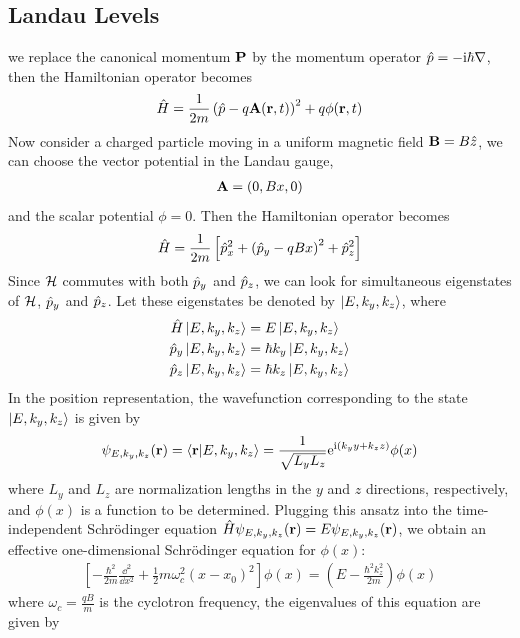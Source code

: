 \subsection{Landau Levels}
we replace the canonical momentum $\mathbf{P}$ by the momentum operator $\hat{p} = - \mathrm{i} \hbar \nabla$, then the Hamiltonian operator becomes
\begin{align}
    \hat{H} = \frac{1}{2m} \left( \hat{p} - q \mathbf{A}(\mathbf{r},t) \right)^2 + q \phi(\mathbf{r},t)
\end{align}
Now consider a charged particle moving in a uniform magnetic field $\mathbf{B} = B \hat{z}$, we can choose the vector potential in the Landau gauge,
\begin{align}
    \mathbf{A} = (0, Bx, 0)
\end{align}
and the scalar potential $\phi = 0$. Then the Hamiltonian operator becomes
\begin{align}
    \hat{H} = \frac{1}{2m} \left[ \hat{p}_x^2 + \left( \hat{p}_y - q B x \right)^2 + \hat{p}_z^2 \right]
\end{align}
Since $\mathcal{H}$ commutes with both $\hat{p}_y$ and $\hat{p}_z$, we can look for simultaneous eigenstates of $\mathcal{H}$, $\hat{p}_y$ and $\hat{p}_z$. Let these eigenstates be denoted by $\ket{E, k_y, k_z}$, where
\begin{align}
    \hat{H} \ket{E, k_y, k_z} &= E \ket{E, k_y, k_z} \\
    \hat{p}_y \ket{E, k_y, k_z} &= \hbar k_y \ket{E, k_y, k_z} \\
    \hat{p}_z \ket{E, k_y, k_z} &= \hbar k_z \ket{E, k_y, k_z}
\end{align}
In the position representation, the wavefunction corresponding to the state $\ket{E, k_y, k_z}$ is given by
\begin{align}
    \psi_{E, k_y, k_z}(\mathbf{r}) = \braket{\mathbf{r}|E, k_y, k_z} = \frac{1}{\sqrt{L_y L_z}} \mathrm{e}^{\mathrm{i} (k_y y + k_z z)} \phi(x)
\end{align}
where $L_y$ and $L_z$ are normalization lengths in the $y$ and $z$ directions, respectively, and $\phi(x)$ is a function to be determined. Plugging this ansatz into the time-independent Schrödinger equation $\hat{H} \psi_{E, k_y, k_z}(\mathbf{r}) = E \psi_{E, k_y, k_z}(\mathbf{r})$, we obtain an effective one-dimensional Schrödinger equation for $\phi(x)$:
\begin{align}
    \left[ -\frac{\hbar^2}{2m} \frac{\dd^2}{\dd x^2} + \frac{1}{2} m \omega_c^2 \left( x - x_0 \right)^2 \right] \phi(x) = \left( E - \frac{\hbar^2 k_z^2}{2m} \right) \phi(x)
\end{align}
where $\omega_c = \frac{q B}{m}$ is the cyclotron frequency, the eigenvalues of this equation are given by
